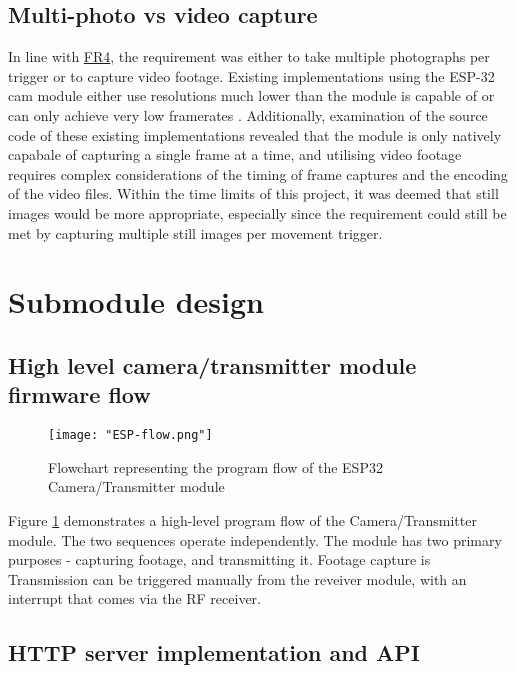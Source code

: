 \documentclass[class=report,11pt,crop=false]{standalone}
\begin{document}
\subsection{Multi-photo vs video capture}

In line with \hyperlink{tab:firmware-requirements}{FR4}, the requirement was either to take multiple photographs per trigger or to capture video footage. Existing implementations using the ESP-32 cam module either use resolutions much lower than the module is capable of or can only achieve very low framerates \cite{zahary2019esp}. Additionally, examination of the source code of these existing implementations revealed that the module is only natively capabale of capturing a single frame at a time, and utilising video footage requires complex considerations of the timing of frame captures and the encoding of the video files. Within the time limits of this project, it was deemed that still images would be more appropriate, especially since the requirement could still be met by capturing multiple still images per movement trigger. 

\section{Submodule design} \label{s:firmware-design-process}

\subsection{High level camera/transmitter module firmware flow}

\begin{figure}[ht]
    \centering
    \texttt{[image: "ESP-flow.png"]}
    \caption{Flowchart representing the program flow of the ESP32 Camera/Transmitter module}
    \label{fig:espflow}
\end{figure}

Figure \ref{fig:espflow} demonstrates a high-level program flow of the Camera/Transmitter module. The two sequences operate independently. The module has two primary purposes - capturing footage, and transmitting it. Footage capture is Transmission can be triggered manually from the reveiver module, with an interrupt that comes via the RF receiver. 

\subsection{HTTP server implementation and API}
\end{document}
